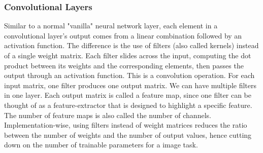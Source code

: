 \documentclass[12pt]{article}
\begin{document}





\subsubsection*{Convolutional Layers}

Similar to a normal "vanilla" neural network layer, each element in a convolutional layer's output comes from a linear combination 
followed by an activation function.
The difference is the use of filters (also called kernels) instead of a single weight matrix.
Each filter slides across the input, computing the dot product between its weights and the corresponding elements, then passes the output through an activation function.
This is a convolution operation.
For each input matrix, one filter produces one output matrix.
We can have multiple filters in one layer.
Each output matrix is called a feature map, since one filter can be thought of as a feature-extractor that is designed to highlight a specific feature. The number of feature maps is also called the number of channels.
Implementation-wise, using filters instead of weight matrices reduces the ratio between the number of weights and the number of output values, hence cutting down on the number of trainable parameters for 
a image task.
\end{document}
